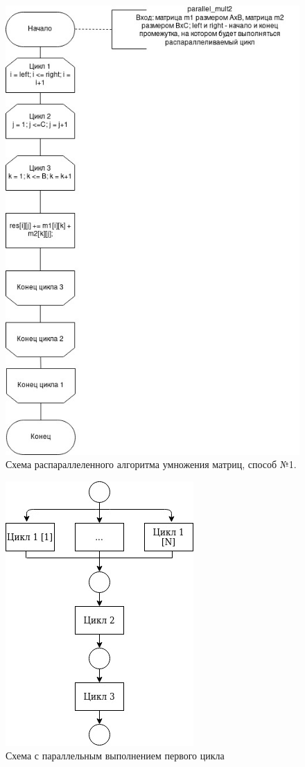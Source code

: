 \documentclass[12pt]{report}
\begin{document}
\begin{figure}[hp!]
	\centering
	\includegraphics[scale=0.7]{report_files/parallel1.jpg}
	\caption{Схема распараллеленного алгоритма умножения матриц, способ №1.}
	\label{fig:mpr}
\end{figure}

\newpage
\begin{figure}[hp!]
	\centering
	\includegraphics[scale=0.7]{report_files/parallel_scheme.jpg}
	\caption{Схема с параллельным выполнением первого цикла}
	\label{fig:mpr}
\end{figure}
\end{document}
